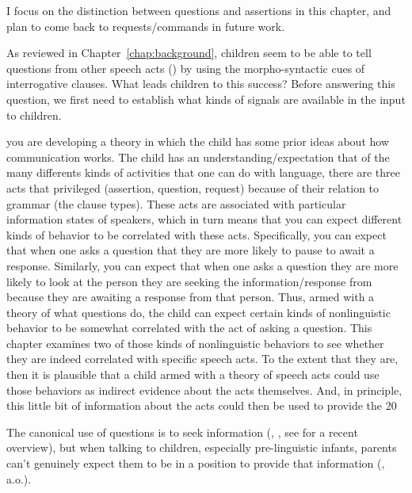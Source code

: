I focus on the distinction between questions and assertions in this chapter, and plan to come back to requests/commands in future work.

As reviewed in Chapter~\ref{chap:background}, children seem to be able to tell questions from other speech acts () by using the morpho-syntactic cues of interrogative clauses. What leads children to this success? Before answering this question, we first need to establish what kinds of signals are available in the input to children. 

you are developing a theory in which the child has some prior ideas about how communication works. The child has an understanding/expectation that of the many differents kinds of activities that one can do with language, there are three acts that privileged (assertion, question, request) because of their relation to grammar (the clause types). These acts are associated with particular information states of speakers, which in turn means that you can expect different kinds of behavior to be correlated with these acts. Specifically, you can expect that when one asks a question that they are more likely to pause to await a response. Similarly, you can expect that when one asks a question they are more likely to look at the person they are seeking the information/response from because they are awaiting a response from that person. Thus, armed with a theory of what questions do, the child can expect certain kinds of nonlinguistic behavior to be somewhat correlated with the act of asking a question. This chapter examines two of those kinds of nonlinguistic behaviors to see whether they are indeed correlated with specific speech acts. To the extent that they are, then it is plausible that a child armed with a theory of speech acts could use those behaviors as indirect evidence about the acts themselves. And, in principle, this little bit of information about the acts could then be used to provide the 20%



The canonical use of questions is to seek information (\citealt{searle1975tax}, \citealt{levinson1983}, see \citealt{krifka2011q} for a recent overview), but when talking to children, especially pre-linguistic infants, parents can’t genuinely expect them to be in a position to provide that information (\citealt{holzman1972, shatz1978comprehension, tamir1980, yu2019pedagogical}, a.o.). %



